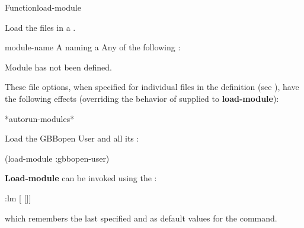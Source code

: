 \documentclass[10pt,twoside,english,pdftex]{article}
\begin{document}

\begin{functiondoc}{Function}{load-module}{
     }
%
% 

\fnsyntax 

\fnpurpose Load the files in a .

\fnpackage {}

\fnmodule {}

\fnargs
\begin{args}{module-name}
 A  naming a 
\arg[option] Any of the following : 
\loadmoduleoptions
\end{args}

\fnerrors Module  has not been defined.\\
\relativedircircularity

\fndescription These file options, when specified for individual files in the
 definition (see \textbf{}), have the
following effects (overriding the behavior of  supplied to
\textbf{load-module}):
%
\W\supp\tabletop
\loadmodulefileoptions

\begin{alsos}{*autorun-modules*}
\end{alsos}

\fnexample 
%
Load the GBBopen User  and all its :
%
\W\supp
\begin{example}
  (load-module :gbbopen-user)
\end{example}

\fnnote \textbf{Load-module} can be invoked using the :
%
%
%
\W\supp
\begin{example}
  :lm \textrm{[} \textrm{[}\superstar\textrm{]]}
\end{example}
%
which remembers the last specified  and  as
default values for the command.

\end{functiondoc}

\end{document}
